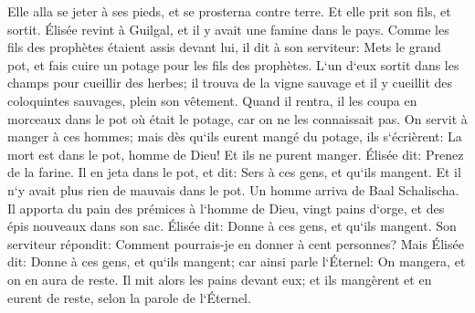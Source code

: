 \verse Elle alla se jeter à ses pieds, et se prosterna contre terre. Et elle prit son fils, et sortit. 
\verse Élisée revint à Guilgal, et il y avait une famine dans le pays. Comme les fils des prophètes étaient assis devant lui, il dit à son serviteur: Mets le grand pot, et fais cuire un potage pour les fils des prophètes. 
\verse L`un d`eux sortit dans les champs pour cueillir des herbes; il trouva de la vigne sauvage et il y cueillit des coloquintes sauvages, plein son vêtement. Quand il rentra, il les coupa en morceaux dans le pot où était le potage, car on ne les connaissait pas. 
\verse On servit à manger à ces hommes; mais dès qu`ils eurent mangé du potage, ils s`écrièrent: La mort est dans le pot, homme de Dieu! Et ils ne purent manger. 
\verse Élisée dit: Prenez de la farine. Il en jeta dans le pot, et dit: Sers à ces gens, et qu`ils mangent. Et il n`y avait plus rien de mauvais dans le pot. 
\verse Un homme arriva de Baal Schalischa. Il apporta du pain des prémices à l`homme de Dieu, vingt pains d`orge, et des épis nouveaux dans son sac. Élisée dit: Donne à ces gens, et qu`ils mangent. 
\verse Son serviteur répondit: Comment pourrais-je en donner à cent personnes? Mais Élisée dit: Donne à ces gens, et qu`ils mangent; car ainsi parle l`Éternel: On mangera, et on en aura de reste. 
\verse Il mit alors les pains devant eux; et ils mangèrent et en eurent de reste, selon la parole de l`Éternel. 

\chapter{}

